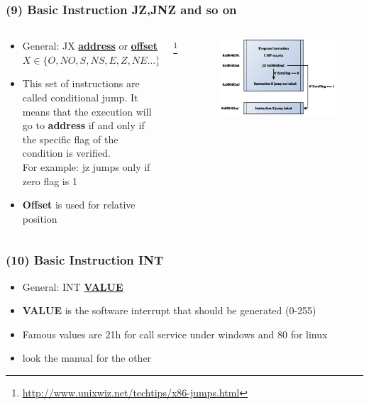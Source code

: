 \documentclass[]{beamer}
\begin{document}
		\begin{frame}
			\frametitle{(9) Basic Instruction JZ,JNZ and so on}
				\begin{columns}
					\begin{column}{2.5in}
						\begin{itemize}
							\item{General: JX \underline{\textbf{address}} or \underline{\textbf{offset}}}\\
							$ X \in \{O,NO,S,NS,E,Z,NE...\}$\\
							\item{This set of instructions are called conditional jump. It means that the execution will go to \textbf{address} if and only if the specific flag of the condition is verified.\\For example: jz jumps only if zero flag is 1}
							\item{\textbf{Offset} is used for relative position}		
							\end{itemize}
					\end{column}\footnote{\url{http://www.unixwiz.net/techtips/x86-jumps.html}}
					\begin{column}{2.5in}
						\begin{figure}
							\includegraphics[width=\textwidth]{images/j_unc.eps}									      \label{control}
							\label{Control Flow JZ}
						\end{figure}
					\end{column}

				\end{columns}
		\end{frame}
		\begin{frame}
			\frametitle{(10) Basic Instruction INT}
				\begin{itemize}
					\item{General: INT \underline{\textbf{VALUE}}}\\
					\item{\textbf{VALUE} is the software interrupt that should be generated (0-255)}
					\item{Famous values are 21h for call service under windows and 80 for linux}
					\item{look the manual for the other } 
				\end{itemize}
		\end{frame}
\end{document}
